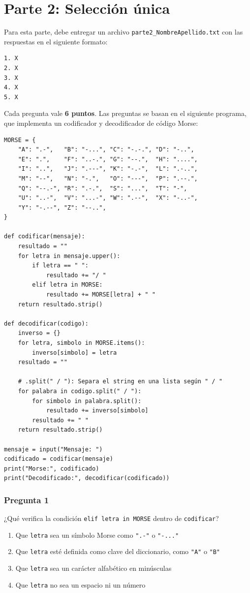 \section*{Parte 2: Selección única}

Para esta parte, debe entregar un archivo \texttt{parte2\_NombreApellido.txt} con las respuestas en el siguiente formato:

\begin{verbatim}
1. X
2. X
3. X
4. X
5. X
\end{verbatim}

Cada pregunta vale \textbf{6 puntos}. Las preguntas se basan en el siguiente programa, que implementa un codificador y decodificador de código Morse:

\begin{verbatim}
MORSE = {
    "A": ".-",   "B": "-...", "C": "-.-.", "D": "-..",
    "E": ".",    "F": "..-.", "G": "--.",  "H": "....",
    "I": "..",   "J": ".---", "K": "-.-",  "L": ".-..",
    "M": "--",   "N": "-.",   "O": "---",  "P": ".--.",
    "Q": "--.-", "R": ".-.",  "S": "...",  "T": "-",
    "U": "..-",  "V": "...-", "W": ".--",  "X": "-..-",
    "Y": "-.--", "Z": "--..",
}

def codificar(mensaje):
    resultado = ""
    for letra in mensaje.upper():
        if letra == " ":
            resultado += "/ "
        elif letra in MORSE:
            resultado += MORSE[letra] + " "
    return resultado.strip()

def decodificar(codigo):
    inverso = {}
    for letra, simbolo in MORSE.items():
        inverso[simbolo] = letra
    resultado = ""

    # .split(" / "): Separa el string en una lista según " / "
    for palabra in codigo.split(" / "): 
        for simbolo in palabra.split():
            resultado += inverso[simbolo]
        resultado += " "
    return resultado.strip()

mensaje = input("Mensaje: ")
codificado = codificar(mensaje)
print("Morse:", codificado)
print("Decodificado:", decodificar(codificado))
\end{verbatim}

\subsubsection*{Pregunta 1}

¿Qué verifica la condición \texttt{elif letra in MORSE} dentro de \texttt{codificar}?

\begin{enumerate}[label=\alph*)]
    \item Que \texttt{letra} sea un símbolo Morse como \texttt{".-"} o \texttt{"-..."}
    \item Que \texttt{letra} esté definida como clave del diccionario, como \texttt{"A"} o \texttt{"B"}
    \item Que \texttt{letra} sea un carácter alfabético en minúsculas
    \item Que \texttt{letra} no sea un espacio ni un número
\end{enumerate}


